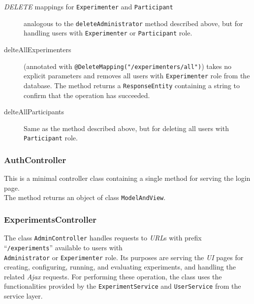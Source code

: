 \documentclass[a4paper]{usiinfbachelorproject}
\begin{document}
\begin{description}
        \item[\emph{DELETE} mappings for \texttt{Experimenter} and \texttt{Participant}] analogous to  the \texttt{deleteAdministrator} method
        described above, but for handling users with \texttt{Experimenter} or \texttt{Participant} role.

        \item[delteAllExperimenters] 
        (annotated with \texttt{@DeleteMapping("/experimenters/all")}) takes no explicit parameters and removes all
        users with \texttt{Experimenter} role from the database. The method returns a \texttt{ResponseEntity} containing a string
        to confirm that the operation has succeeded.

        \item[delteAllParticipants]
        Same as the method described above, but for deleting all users with \texttt{Participant} role.

    \end{description}

\subsubsection{\textbf{AuthController}}

This is a minimal controller class containing a single method for serving the login page. \\ The method returns
an object of class \texttt{ModelAndView}.

\subsubsection{\textbf{ExperimentsController}}

The class \texttt{AdminController} handles requests to \emph{URL}s with prefix ``\texttt{/experiments}'' available to users with \\ \texttt{Administrator}
or \texttt{Experimenter} role. Its purposes are serving the \emph{UI} pages for creating, configuring, running, and evaluating
experiments, and handling the related \emph{Ajax} requests. For performing these operation, the class uses the functionalities
provided by the \texttt{ExperimentService} and \texttt{UserService} from the service layer. 
\end{document}
